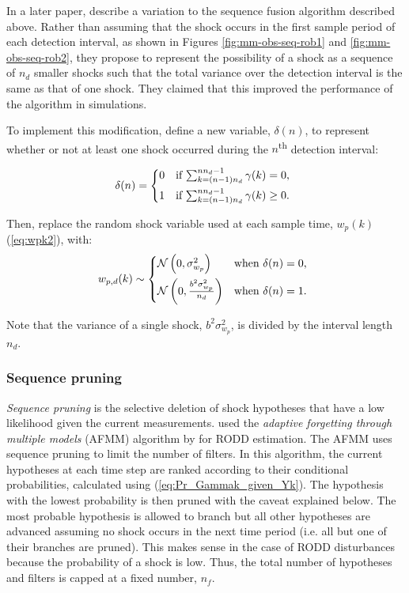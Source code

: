 In a later paper, \cite{robertson_method_1998} describe a variation to the sequence fusion algorithm described above.  Rather than assuming that the shock occurs in the first sample period of each detection interval, as shown in Figures \ref{fig:mm-obs-seq-rob1} and \ref{fig:mm-obs-seq-rob2}, they propose to represent the possibility of a shock as a sequence of $n_d$ smaller shocks such that the total variance over the detection interval is the same as that of one shock. They claimed that this improved the performance of the algorithm in simulations.

To implement this modification, define a new variable, $\delta(n)$, to represent whether or not at least one shock occurred during the $n$\textsuperscript{th} detection interval:

\begin{equation} \label{eq:deltak}
	\delta(n) = \begin{cases*}
		0 & \text{if} $\sum_{k=(n-1) n_d}^{n n_d - 1} \gamma(k)=0$, \\
		1 & \text{if} $\sum_{k=(n-1) n_d}^{n n_d - 1} \gamma(k)\ge0$.
	\end{cases*}
\end{equation}

Then, replace the random shock variable used at each sample time, $w_p(k)$ (\ref{eq:wpk2}), with:
\begin{equation} \label{eq:wpdk}
	w_{p,d}(k) \sim 
	\begin{cases*}
		\mathcal{N}\left(0, \sigma_{w_p}^2\right) & \text{when} $\delta(n) = 0$, \\
		\mathcal{N}\left(0, \frac{b^2\sigma_{w_p}^2}{n_d}\right) & \text{when} $\delta(n) = 1$.
	\end{cases*}
\end{equation}

Note that the variance of a single shock, $b^2\sigma_{w_p}^2$, is divided by the interval length $n_d$.

\subsubsection{Sequence pruning} \label{subsec-pruning}

\textit{Sequence pruning} is the selective deletion of shock hypotheses that have a low likelihood given the current measurements. \cite{eriksson_classification_1996} used the \textit{adaptive forgetting through multiple models} (AFMM) algorithm by \cite{andersson_adaptive_1985} for RODD estimation. The AFMM uses sequence pruning to limit the number of filters. In this algorithm, the current hypotheses at each time step are ranked according to their conditional probabilities, calculated using (\ref{eq:Pr_Gammak_given_Yk}). The hypothesis with the lowest probability is then pruned with the caveat explained below. The most probable hypothesis is allowed to branch but all other hypotheses are advanced assuming no shock occurs in the next time period (i.e. all but one of their branches are pruned). This makes sense in the case of RODD disturbances because the probability of a shock is low. Thus, the total number of hypotheses and filters is capped at a fixed number, $n_f$.

